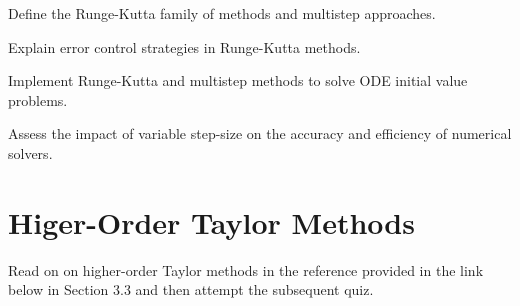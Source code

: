 \begin{mlos}
\item Define the Runge-Kutta family of methods and multistep approaches.
\item Explain error control strategies in Runge-Kutta methods.
\item Implement Runge-Kutta and multistep methods to solve ODE initial value problems.
\item Assess the impact of variable step-size on the accuracy and efficiency of numerical solvers. 
\end{mlos}

\section{Higer-Order Taylor Methods}
\activities
Read on on higher-order Taylor methods in the reference provided in the link below in Section 3.3 and then attempt the subsequent quiz.
\begin{activity}[\cg Reading]
\end{activity}

